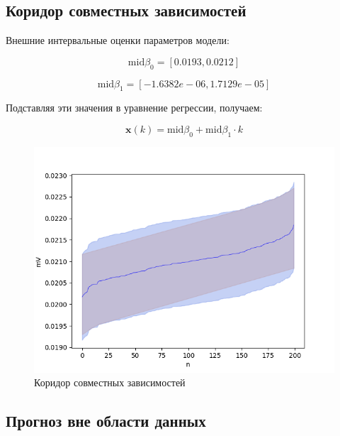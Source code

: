 \subsection{Коридор совместных зависимостей}

Внешние интервальные оценки параметров модели: 

\begin{equation*}
	\text{mid} \beta_0 = [0.0193, 0.0212]
\end{equation*}

\begin{equation*}
	\text{mid} \beta_1 = [-1.6382e-06, 1.7129e-05]
\end{equation*}

Подставляя эти значения в уравнение регрессии, получаем:

\begin{equation}
	\bm{x}(k) = \text{mid} \beta_0 + \text{mid} \beta_1 \cdot k
\end{equation}

\begin{figure}[H]
	\begin{center}
		\includegraphics[scale = 0.55]{resources/corridor_of_joint_dependencies.png}
	\end{center}
	\caption{Коридор совместных зависимостей}
\end{figure}

\subsection{Прогноз вне области данных}

